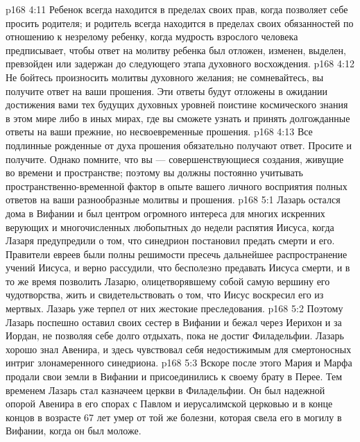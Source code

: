 \vs p168 4:11 \pc {}\bibnobreakspace Ребенок всегда находится в пределах своих прав, когда позволяет себе просить родителя; и родитель всегда находится в пределах своих обязанностей по отношению к незрелому ребенку, когда мудрость взрослого человека предписывает, чтобы ответ на молитву ребенка был отложен, изменен, выделен, превзойден или задержан до следующего этапа духовного восхождения.
\vs p168 4:12 \pc {}\bibnobreakspace Не бойтесь произносить молитвы духовного желания; не сомневайтесь, вы получите ответ на ваши прошения. Эти ответы будут отложены в ожидании достижения вами тех будущих духовных уровней поистине космического знания в этом мире либо в иных мирах, где вы сможете узнать и принять долгожданные ответы на ваши прежние, но несвоевременные прошения.
\vs p168 4:13 \pc {}\bibnobreakspace Все подлинные рожденные от духа прошения обязательно получают ответ. Просите и получите. Однако помните, что вы --- совершенствующиеся создания, живущие во времени и пространстве; поэтому вы должны постоянно учитывать пространственно\hyp{}временной фактор в опыте вашего личного восприятия полных ответов на ваши разнообразные молитвы и прошения.
\vs p168 5:1 Лазарь остался дома в Вифании и был центром огромного интереса для многих искренних верующих и многочисленных любопытных до недели распятия Иисуса, когда Лазаря предупредили о том, что синедрион постановил предать смерти и его. Правители евреев были полны решимости пресечь дальнейшее распространение учений Иисуса, и верно рассудили, что бесполезно предавать Иисуса смерти, и в то же время позволить Лазарю, олицетворявшему собой самую вершину его чудотворства, жить и свидетельствовать о том, что Иисус воскресил его из мертвых. Лазарь уже терпел от них жестокие преследования.
\vs p168 5:2 Поэтому Лазарь поспешно оставил своих сестер в Вифании и бежал через Иерихон и за Иордан, не позволяя себе долго отдыхать, пока не достиг Филадельфии. Лазарь хорошо знал Авенира, и здесь чувствовал себя недостижимым для смертоносных интриг злонамеренного синедриона.
\vs p168 5:3 Вскоре после этого Мария и Марфа продали свои земли в Вифании и присоединились к своему брату в Перее. Тем временем Лазарь стал казначеем церкви в Филадельфии. Он был надежной опорой Авенира в его спорах с Павлом и иерусалимской церковью и в конце концов в возрасте 67 лет умер от той же болезни, которая свела его в могилу в Вифании, когда он был моложе.
